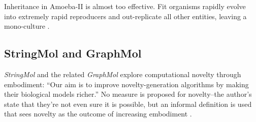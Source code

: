 Inheritance in Amoeba-II is almost too effective. Fit organisms rapidly evolve into extremely rapid reproducers and out-replicate all other entities, leaving a mono-culture \parencite{Pargellis2001}.

%
%
%
%
\subsection{StringMol and GraphMol}

\emph{StringMol} \parencite{Hickinbotham2011} and the related \emph{GraphMol} \parencite{Nellis2012, Nellis2014} explore computational novelty through embodiment: ``Our aim is to improve novelty-generation algorithms by making their biological models richer.'' No measure is proposed for novelty--the author's state that they're not even sure it is possible, but an informal definition is used that sees novelty as the outcome of increasing embodiment \parencite[p.87]{Nellis2012}. 

